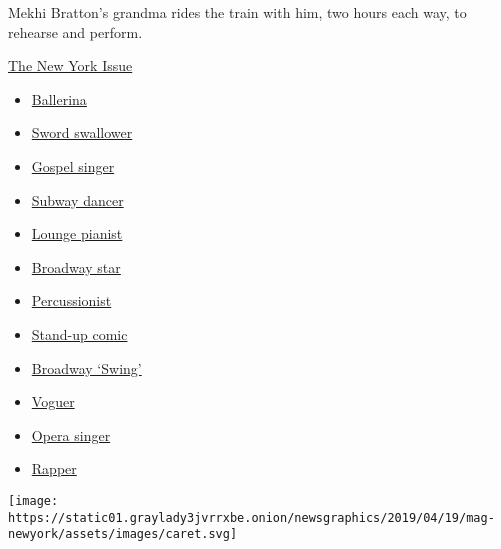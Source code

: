 Mekhi Bratton's grandma rides the train with him, two hours each way, to
rehearse and perform.

\href{https://www.nytimes3xbfgragh.onion/interactive/2019/05/30/magazine/performers-new-york.html}{The
New York Issue}

\begin{itemize}
\tightlist
\item
  \href{https://www.nytimes3xbfgragh.onion/interactive/2019/05/30/magazine/dance-ballet-new-york.html}{Ballerina}
\item
  \href{https://www.nytimes3xbfgragh.onion/interactive/2019/05/30/magazine/sword-swallowing-new-york.html}{Sword
  swallower}
\item
  \href{https://www.nytimes3xbfgragh.onion/interactive/2019/05/30/magazine/gospel-singer-new-york.html}{Gospel
  singer}
\item
  \href{https://www.nytimes3xbfgragh.onion/interactive/2019/05/30/magazine/subway-dance-new-york.html}{Subway
  dancer}
\item
  \href{https://www.nytimes3xbfgragh.onion/interactive/2019/05/30/magazine/earl-rose-piano-carlyle-new-york.html}{Lounge
  pianist}
\item
  \href{https://www.nytimes3xbfgragh.onion/interactive/2019/05/30/magazine/broadway-kiss-me-kate.html}{Broadway
  star}
\item
  \href{https://www.nytimes3xbfgragh.onion/interactive/2019/05/30/magazine/latin-beat-new-york.html}{Percussionist}
\item
  \href{https://www.nytimes3xbfgragh.onion/interactive/2019/05/30/magazine/female-comedy-new-york.html}{Stand-up
  comic}
\item
  \href{https://www.nytimes3xbfgragh.onion/interactive/2019/05/30/magazine/aladdin-musical-new-york.html}{Broadway
  `Swing'}
\item
  \href{https://www.nytimes3xbfgragh.onion/interactive/2019/05/30/magazine/vogue-kiki-new-york.html}{Voguer}
\item
  \href{https://www.nytimes3xbfgragh.onion/interactive/2019/05/30/magazine/metropolitan-opera-singer-new-york.html}{Opera
  singer}
\item
  \href{https://www.nytimes3xbfgragh.onion/interactive/2019/05/30/magazine/princess-nokia-new-york.html}{Rapper}
\end{itemize}

\texttt{[image: https://static01.graylady3jvrrxbe.onion/newsgraphics/2019/04/19/mag-newyork/assets/images/caret.svg]}

